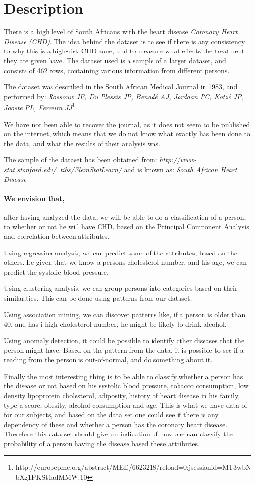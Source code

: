 \section{Description}
There is a high level of South Africans with the heart disease \textit{Coronary Heart Disease (CHD)}. The idea behind the dataset is to see if there is any consistency to why this is a high-risk CHD zone, and to measure what effects the treatment they are given have. The dataset used is a sample of a larger dataset, and consists of 462 rows, containing various information from different persons.

The dataset was described in the South African Medical Journal in 1983, and performed by: \textit{Rossouw JE, Du Plessis JP, Benadé AJ, Jordaan PC, Kotzé JP, Jooste PL, Ferreira JJ}\footnote{http://europepmc.org/abstract/MED/6623218/reload=0;jsessionid=MT3wbNbXg1PKSt1adMMW.10}

We have not been able to recover the journal, as it does not seem to be published on the internet, which means that we do not know what exactly has been done to the data, and what the results of their analysis was.

The sample of the dataset has been obtained from: \textit{http://www-stat.stanford.edu/~tibs/ElemStatLearn/} and is known as: \textit{South African Heart Disease}

\paragraph{We envision that,} after having analyzed the data, we will be able to do a classification of a person, to whether or not he will have CHD, based on the Principal Component Analysis and correlation between attributes.

Using regression analysis, we can predict some of the attributes, based on the others. I.e given that we know a persons cholesterol number, and his age, we can predict the systolic blood pressure.

Using clustering analysis, we can group persons into categories based on their similarities. This can be done using patterns from our dataset.

Using association mining, we can discover patterns like, if a person is older than 40, and has i high cholesterol number, he might be likely to drink alcohol.

Using anomaly detection, it could be possible to identify other diseases that the person might have. Based on the pattern from the data, it is possible to see if a reading from the person is out-of-normal, and do something about it.

Finally the most interesting thing is to be able to classify whether a person has the disease or not based on his systolic blood pressure, tobacco consumption, low density lipoprotein cholesterol, adiposity, history of heart disease in his family, type-a score, obesity, alcohol consumption and age. This is what we have data of for our subjects, and based on the data set one could see if there is any dependency of these and whether a person has the coronary heart disease. Therefore this data set should give an indication of how one can classify the probability of a person having the disease based these attributes.